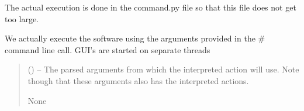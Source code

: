 \documentclass[letterpaper,11pt,english]{sphinxmanual}
\begin{document}
\sphinxAtStartPar
The actual execution is done in the command.py file so that this file
does not get too large.

\begin{savenotes}\begin{fulllineitems}
\label{\detokenize{code/opihiexarata.__main__:opihiexarata.__main__.__main_execute_arguments}}
\pysigstartsignatures
{}
\pysigstopsignatures
\sphinxAtStartPar
We actually execute the software using the arguments provided in the
\# command line call. GUI’s are started on separate threads
\begin{quote}\begin{description}
\sphinxAtStartPar
{} () – The parsed arguments from which the interpreted action will use. Note
though that these arguments also has the interpreted actions.

\sphinxAtStartPar
None

\end{description}\end{quote}

\end{fulllineitems}\end{savenotes}

\end{document}
